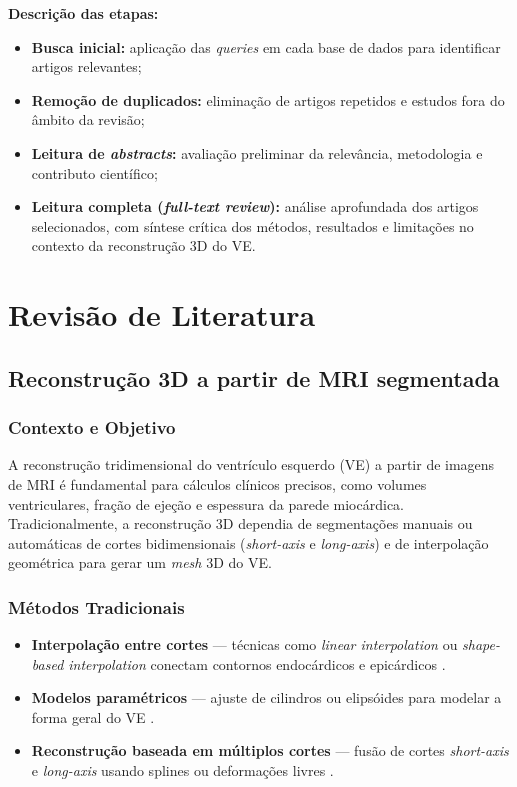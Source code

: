 \documentclass[12pt,a4paper]{report}
\begin{document}
\bigskip

\noindent\textbf{Descrição das etapas:}
\begin{itemize}
    \item \textbf{Busca inicial:} aplicação das \textit{queries} em cada base de dados para identificar artigos relevantes;
    \item \textbf{Remoção de duplicados:} eliminação de artigos repetidos e estudos fora do âmbito da revisão;
    \item \textbf{Leitura de \textit{abstracts}:} avaliação preliminar da relevância, metodologia e contributo científico;
    \item \textbf{Leitura completa (\textit{full-text review}):} análise aprofundada dos artigos selecionados, com síntese crítica dos métodos, resultados e limitações no contexto da reconstrução 3D do VE.
\end{itemize}


\chapter{Revisão de Literatura}

\section{Reconstrução 3D a partir de MRI segmentada}

\subsection*{Contexto e Objetivo}
A reconstrução tridimensional do ventrículo esquerdo (VE) a partir de imagens de MRI é fundamental para cálculos clínicos precisos, como volumes ventriculares, fração de ejeção e espessura da parede miocárdica. Tradicionalmente, a reconstrução 3D dependia de segmentações manuais ou automáticas de cortes bidimensionais (\textit{short-axis} e \textit{long-axis}) e de interpolação geométrica para gerar um \textit{mesh} 3D do VE.

\subsection*{Métodos Tradicionais}
\begin{itemize}
    \item \textbf{Interpolação entre cortes} — técnicas como \textit{linear interpolation} ou \textit{shape-based interpolation} conectam contornos endocárdicos e epicárdicos \parencite{mahmoudzadeh-2013, lopez-perez-2015}.
    \item \textbf{Modelos paramétricos} — ajuste de cilindros ou elipsóides para modelar a forma geral do VE \parencite{roohi-2012}.
    \item \textbf{Reconstrução baseada em múltiplos cortes} — fusão de cortes \textit{short-axis} e \textit{long-axis} usando splines ou deformações livres \parencite{ferrante-2017}.
\end{itemize}
\end{document}
